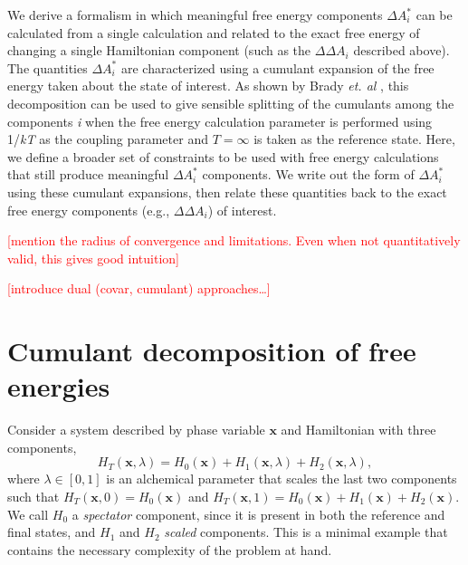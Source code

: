\documentclass[%
 preprint,
 amsmath,amssymb,
 aps,
]{revtex4-1}
\newcommand{\warning}[1]{{\textsf{{\textcolor{red}{{[#1]}{}}}}}}
\renewcommand{\vec}[1]{{\mathbf{#1}}}
\begin{document}
We derive a formalism in which meaningful free energy components $\Delta A^*_i$ can be calculated from a single calculation and related to the exact free energy of changing a single Hamiltonian component (such as the $\Delta \Delta A_i$ described above).  The quantities $\Delta A^*_i$ are characterized using a cumulant expansion of the free energy taken about the state of interest.  As shown by Brady \emph{et. al} \cite{Brady:1996gm}, this decomposition can be used to give sensible splitting of the cumulants among the components \textit{i} when the free energy calculation parameter is performed using 1/\emph{kT} as the coupling parameter and $T=\infty$ is taken as the reference state.  Here, we define a broader set of constraints to be used with free energy calculations that still produce meaningful $\Delta A^*_i$ components.  We write out the form of $\Delta A^*_i$ using these cumulant expansions, then relate these quantities back to the exact free energy components (e.g., $\Delta \Delta A_i$) of interest.  

\warning{mention the radius of convergence and limitations.  Even when not quantitatively valid, this gives good intuition}

\warning{introduce dual (covar, cumulant) approaches\dots}


\section{Cumulant decomposition of free energies}
\label{S:CumulantGeneral}

Consider a system described by phase variable $\vec{x}$ and Hamiltonian with three components,
\begin{equation}
H_T(\vec{x},\lambda) = H_0(\vec{x}) + H_1(\vec{x},\lambda) + H_2(\vec{x},\lambda),
\end{equation}
where $\lambda \in [ 0, 1] $ is an alchemical parameter that scales the last two components such that 
$
H_T(\vec{x},0) = H_0 (\vec{x})
$
and 
$
H_T(\vec{x},1) = H_0(\vec{x}) + H_1(\vec{x}) + H_2(\vec{x}).
$
We call $H_0$ a \emph{spectator} component, since it is present in both the reference and final states, and $H_1$ and $H_2$ \emph{scaled} components.  This is a minimal example that contains the necessary complexity of the problem at hand.
 
\end{document}
